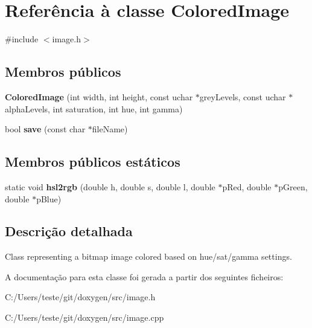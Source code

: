 \hypertarget{class_colored_image}{\section{Referência à classe Colored\-Image}
\label{class_colored_image}
}


{\ttfamily \#include $<$image.\-h$>$}

\subsection*{Membros públicos}
\begin{DoxyCompactItemize}
\item 
\hypertarget{class_colored_image_a2fff1b49986eada284eceff9be751d38}{{\bfseries Colored\-Image} (int width, int height, const uchar $\ast$grey\-Levels, const uchar $\ast$alpha\-Levels, int saturation, int hue, int gamma)}\label{class_colored_image_a2fff1b49986eada284eceff9be751d38}

\item 
\hypertarget{class_colored_image_aca0cd00ffef3eb58b9c2f03e1456709a}{bool {\bfseries save} (const char $\ast$file\-Name)}\label{class_colored_image_aca0cd00ffef3eb58b9c2f03e1456709a}

\end{DoxyCompactItemize}
\subsection*{Membros públicos estáticos}
\begin{DoxyCompactItemize}
\item 
\hypertarget{class_colored_image_a02b5f11d8528e76dedd4c01c692056b5}{static void {\bfseries hsl2rgb} (double h, double s, double l, double $\ast$p\-Red, double $\ast$p\-Green, double $\ast$p\-Blue)}\label{class_colored_image_a02b5f11d8528e76dedd4c01c692056b5}

\end{DoxyCompactItemize}


\subsection{Descrição detalhada}
Class representing a bitmap image colored based on hue/sat/gamma settings. 

A documentação para esta classe foi gerada a partir dos seguintes ficheiros\-:\begin{DoxyCompactItemize}
\item 
C\-:/\-Users/teste/git/doxygen/src/image.\-h\item 
C\-:/\-Users/teste/git/doxygen/src/image.\-cpp\end{DoxyCompactItemize}
